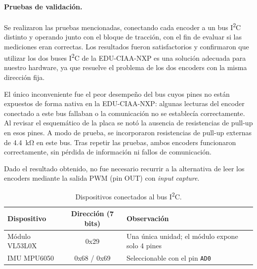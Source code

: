 \paragraph{Pruebas de validación.}
Se realizaron las pruebas mencionadas, conectando cada encoder a un bus I\textsuperscript{2}C distinto y operando junto con el bloque de tracción, con el fin de evaluar si las mediciones eran correctas. Los resultados fueron satisfactorios y confirmaron que utilizar los dos buses I\textsuperscript{2}C de la EDU-CIAA-NXP es una solución adecuada para nuestro hardware, ya que resuelve el problema de los dos encoders con la misma dirección fija.

El único inconveniente fue el peor desempeño del bus cuyos pines no están expuestos de forma nativa en la EDU-CIAA-NXP: algunas lecturas del encoder conectado a este bus fallaban o la comunicación no se establecía correctamente. Al revisar el esquemático de la placa se notó la ausencia de resistencias de pull-up en esos pines. A modo de prueba, se incorporaron resistencias de pull-up externas de \SI{4.4}{\kilo\ohm} en este bus. Tras repetir las pruebas, ambos encoders funcionaron correctamente, sin pérdida de información ni fallos de comunicación.

Dado el resultado obtenido, no fue necesario recurrir a la alternativa de leer los encoders mediante la salida PWM (pin OUT) con \textit{input capture}.

\begin{table}[H]
\centering
\caption{Dispositivos conectados al bus I\textsuperscript{2}C.}
\label{tab:i2c}
\small
\begin{tabular}{L{3.8cm}cL{5.6cm}}
\toprule
Dispositivo & Dirección (7 bits) & Observación \\
\midrule
Módulo VL53L0X & 0x29 & Una única unidad; el módulo expone solo 4 pines \\
IMU MPU6050 & 0x68 / 0x69 & Seleccionable con el pin \texttt{AD0} \\
\bottomrule
\end{tabular}
\end{table}


